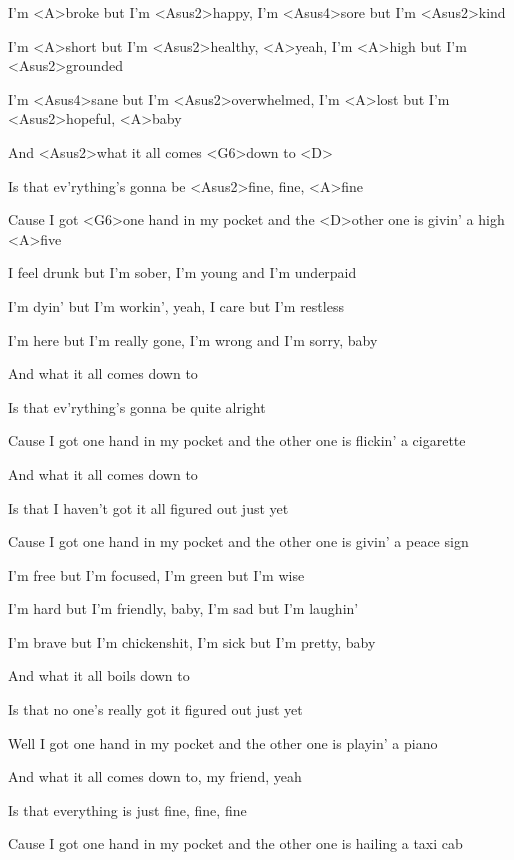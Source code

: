 

\zs
I'm <A>broke but I'm <Asus2>happy,
I'm <Asus4>sore but I'm <Asus2>kind

I'm <A>short but I'm <Asus2>healthy, <A>yeah,
I'm <A>high but I'm <Asus2>grounded

I'm <Asus4>sane but I'm <Asus2>overwhelmed,
I'm <A>lost but I'm <Asus2>hopeful, <A>baby
\ks

\zr
And <Asus2>what it all comes <G6>down to <D>

Is that ev'rything's gonna be <Asus2>fine, fine, <A>fine

Cause I got <G6>one hand in my pocket
and the <D>other one is givin' a high <A>five
\kr

\zs
I feel drunk but I'm sober,
I'm young and I'm underpaid

I'm dyin' but I'm workin', yeah,
I care but I'm restless

I'm here but I'm really gone,
I'm wrong and I'm sorry, baby
\ks

\zr
And what it all comes down to

Is that ev'rything's gonna be quite alright

Cause I got one hand in my pocket
and the other one is flickin' a cigarette
\kr

\zr
And what it all comes down to

Is that I haven't got it all figured out just yet

Cause I got one hand in my pocket
and the other one is givin' a peace sign
\kr

\zs
I'm free but I'm focused,
I'm green but I'm wise

I'm hard but I'm friendly, baby,
I'm sad but I'm laughin'

I'm brave but I'm chickenshit,
I'm sick but I'm pretty, baby
\ks

\zr
And what it all boils down to

Is that no one's really got it figured out just yet

Well I got one hand in my pocket
and the other one is playin' a piano
\kr

\zr
And what it all comes down to, my friend, yeah

Is that everything is just fine, fine, fine

Cause I got one hand in my pocket
and the other one is hailing a taxi cab
\kr

\kp





